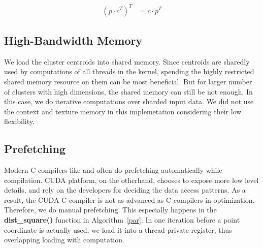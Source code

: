 \begin{align*}
  (p \cdot c^T)^T &= c \cdot p^T
\end{align*}

\subsection{High-Bandwidth Memory}

We load the cluster centroids into shared memory. Since centroids are sharedly 
used by computations of all threads in the kernel, spending the highly restricted
shared memory resource on them can be most beneficial. 
But for larger number of clusters with high dimensions, the shared memory
can still be not enough. In this case,
we do iterative computations over sharded input data.
We did not use the context and texture memory in this 
implemetation considering their low flexibility.

\subsection{Prefetching}

Modern C compilers like \gcc and \clang often do prefetching automatically while
compilation. CUDA platform, on the otherhand, chooses to expose more low level 
details, and rely on the developers for deciding the data access patterns. As a 
result, the CUDA C compiler is not as advanced as C compilers in optimization.
Therefore, we do manual prefetching.
This especially happens in the \textbf{dist\_square()} function in 
Algorithm~\ref{par}. In one iteration before a point coordinate is actually used, 
we load it into a thread-private register, thus overlapping loading with 
computation.

